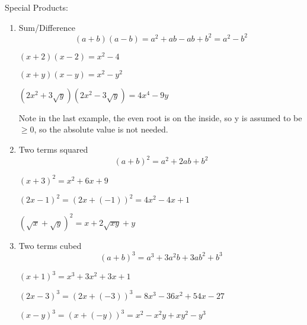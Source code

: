 \documentclass[letterpaper,12pt,fleqn]{article}
\begin{document}
Special Products:
\begin{enumerate}
\item Sum/Difference
  \[(a+b)(a-b)=a^2+ab-ab+b^2=a^2-b^2\]

  \begin{example}
    $(x+2)(x-2)=x^2-4$

    $(x+y)(x-y)=x^2-y^2$

    $(2x^2+3\sqrt{y})(2x^2-3\sqrt{y})=4x^4-9y$

    Note in the last example, the even root is on the inside, so y is assumed
    to be $\ge0$, so the absolute value is not needed.
  \end{example}

\item Two terms squared
  \[(a+b)^2=a^2+2ab+b^2\]

  \begin{example}
    $(x+3)^2=x^2+6x+9$

    $(2x-1)^2=(2x+(-1))^2=4x^2-4x+1$

    $(\sqrt{x}+\sqrt{y})^2=x+2\sqrt{xy}+y$
  \end{example}

\item Two terms cubed
  \[(a+b)^3=a^3+3a^2b+3ab^2+b^3\]

  \begin{example}
    $(x+1)^3=x^3+3x^2+3x+1$

    $(2x-3)^3=(2x+(-3))^3=8x^3-36x^2+54x-27$

    $(x-y)^3=(x+(-y))^3=x^2-x^2y+xy^2-y^3$
  \end{example}
\end{enumerate}
\end{document}
